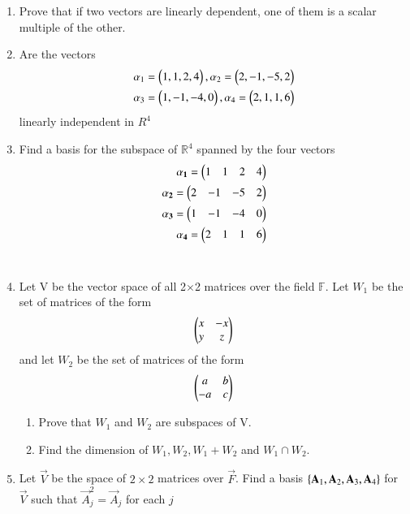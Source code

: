 \renewcommand{\theequation}{\theenumi}
\renewcommand{\thefigure}{\theenumi}
\begin{enumerate}[label=\thesubsection.\arabic*.,ref=\thesubsection.\theenumi]
\item Prove that if two vectors are linearly dependent, one of them is a scalar multiple of the other.
%
\\
\solution

%
\item Are the vectors 
\begin{align}
\alpha{_1}=\begin{pmatrix}1,1,2,4\end{pmatrix} , \alpha{_2}=\begin{pmatrix}2,-1,-5,2\end{pmatrix} \\
\alpha{_3}=\begin{pmatrix}1,-1,-4,0\end{pmatrix} , \alpha{_4}=\begin{pmatrix}2,1,1,6\end{pmatrix}
\end{align}
linearly independent in $R^{4}$
%
\\
\solution

%
\item Find a basis for the subspace of $\mathbb{R}^{4}$ spanned by the four vectors
\begin{align}
\mathbf{\alpha_1} = \begin{pmatrix}1&1&2&4\end{pmatrix}\\
\mathbf{\alpha_2} = \begin{pmatrix}2&-1&-5&2\end{pmatrix}\\
\mathbf{\alpha_3} = \begin{pmatrix}1&-1&-4&0\end{pmatrix}\\
\mathbf{\alpha_4} = \begin{pmatrix}2&1&1&6\end{pmatrix}
\end{align}
%
\\
\solution

%
\item Let V be the vector space of all 2$\times$2 matrices over the field $\mathbb{F}$. Let $W_1$ be the set of matrices of the form 
\begin{align}
    \begin{pmatrix}x&-x\\y&z\end{pmatrix}
\end{align}
and let $W_2$ be the set of matrices of the form 
\begin{align}
    \begin{pmatrix}a&b\\-a&c\end{pmatrix}
\end{align}
%
\begin{enumerate}
    \item Prove that $W_1$ and $W_2$ are subspaces of V.
    \item Find the dimension of $W_1, W_2, W_1+W_2$ and $W_1\cap W_2$.
\end{enumerate}
%
\solution

%
\item Let $\vec{V}$ be the space of $2\times2$ matrices over $\vec{F}$. Find a basis $\left\{\mathbf{A}_1, \mathbf{A}_2, \mathbf{A}_3, \mathbf{A}_4\right\}$ for $\vec{V}$ such that $\vec{A}_j^2 = \vec{A}_j$ for each $j$

\end{enumerate}
